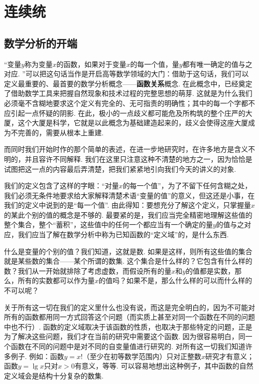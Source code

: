 \documentclass[color=cyan,mathpazo,titlestyle=hang]{elegantbook_mac}
\author{David Lee}
\begin{document}
\maketitle
\tableofcontents
\mainmatter

\chapter{连续统}
\section{数学分析的开端}

``变量$y$称为变量$x$的函数，如果对于变量$x$的每一个值，量$y$都有唯一确定的值与之对应. ''可以把这句话当作是开启高等数学领域的大门：借助于这句话，我们可以定义最重要的、最首要的数学分析概念——\textbf{函数关系}概念. 在此概念中，已经奠定了借助数学工具来把握自然现象和技术过程的完整思想的萌芽. 这就是为什么我们必须毫不含糊地要求这个定义有完全的、无可指责的明确性；其中的每一个字都不应引起一点怀疑的阴影. 在此，极小的一点歧义都可能危及所构筑的整个庄严的大厦，这个大厦是科学，它就是以此概念为基础建造起来的，歧义会使得这座大厦成为不完善的，需要从根本上重建. 

而同时我们开始时作的那个简单的表述，在进一步地研究时，在许多地方是含义不明的，并且容许不同解释. 我们在这里只注意这种不清楚的地方之一，因为恰恰是试图把这一点的内容最后弄清楚，把我们紧紧地引向我们今天的讲义的对象. 

我们的定义包含了这样的字眼：``对量$x$的每一个值''，为了不留下任何含糊之处，我们必须无条件地要求给大家解释清楚术语``变量的值''的意义，但这还是小事，在我们的定义中说到的是``每一个值''. 由此得知：要想充分了解这个定义，只掌握量$x$的某此个别的值的概念是不够的. 最要紧的是，我们应当完全精密地理解这些值的整个集合，整个``蓄积''，这些值中的任何一个都应当有一个确定的量$y$的值与之对应，我们应当了解在数学分析中称为已知函数的``定义域''的，是什么东西. 

什么是变量的个别的值？我们知道，这就是数. 如果是这样，则所有这些值的集合就是某些数的集合——某个所谓的数集. 这个集合是什么样的？它包含有什么样的数？我们从一开始就排除了考虑虚数，而假设所有的量$x$和$y$的值都是实数，那么，所有的实数都可以作为量$x$的值吗？如果不是，那么什么样的可以而什么样的不可以呢？

关于所有这一切在我们的定义里什么也没有说，而这是完全明白的，因为不可能对所有的函数都用同一方式回答这个问题（而实质上甚至对同一个函数在不同的问题中也不行）. 函数的定义域取决于该函数的性质，也取决于那些特定的问题，正是为了解决这些问题，我们才在当前的研究中需要这个函数. 因为很容易明白，同一个函数在不同的问题中是对不同的自变量值进行研究的. 对所有这一切我们知道许多例子. 例如：函数$y = x!$（至少在初等数学范围内）只对正整数$x$研究才有意义；函数$y = \lg{x}$只对$x>0$有意义，等等. 可以容易地想出这种例子，其中函数的自然定义域会是结构十分复杂的数集. 
\end{document}
